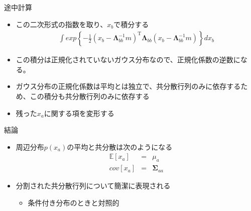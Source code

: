\begin{frame}{途中計算}
 \begin{itemize}
  \item この二次形式の指数を取り、$x_b$で積分する
        \begin{eqnarray}
         \int exp\left\{-\frac{1}{2}(x_b-\bm{\Lambda}_{bb}^{-1}m)^{\mathrm{T}}\bm{\Lambda}_{bb}(x_b-\bm{\Lambda}_{bb}^{-1}m)\right\}dx_b
        \end{eqnarray}
  \item この積分は正規化されていないガウス分布なので、正規化係数の逆数になる。
  \item ガウス分布の正規化係数は平均とは独立で、共分散行列のみに依存するため、この積分も共分散行列のみに依存する
  \item 残った$x_a$に関する項を変形する
 \end{itemize}
\end{frame}

\begin{frame}{結論}
 \begin{itemize}
  \item 周辺分布$p(x_a)$の平均と共分散は次のようになる
        \begin{eqnarray}
         \mathbb{E}[x_a] &=&  \mu_a\\
         cov[x_a]&=&\bm{\Sigma}_{aa}
        \end{eqnarray}
  \item 分割された共分散行列について簡潔に表現される
        \begin{itemize}
         \item 条件付き分布のときと対照的
        \end{itemize}
 \end{itemize}
\end{frame}
